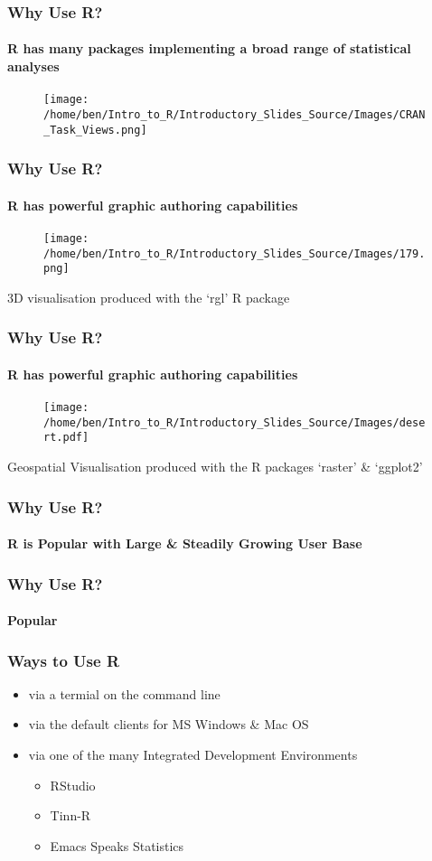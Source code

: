 \documentclass[xcolor=dvipsnames]{beamer}
\begin{document}
\begin{frame} 
\frametitle{Why Use R?}
\framesubtitle{R has many packages implementing a broad range of statistical analyses}

\begin{figure}
\texttt{[image: /home/ben/Intro\_to\_R/Introductory\_Slides\_Source/Images/CRAN\_Task\_Views.png]}
\end{figure}

\end{frame}

\begin{frame} 
\frametitle{Why Use R?}
\framesubtitle{R has powerful graphic authoring capabilities}

\begin{figure}
\texttt{[image: /home/ben/Intro\_to\_R/Introductory\_Slides\_Source/Images/179.png]}
\end{figure}

\tiny 3D visualisation produced with the `rgl' R package

\end{frame}

\begin{frame} 
\frametitle{Why Use R?}
\framesubtitle{R has powerful graphic authoring capabilities}

\begin{figure}
\texttt{[image: /home/ben/Intro\_to\_R/Introductory\_Slides\_Source/Images/desert.pdf]}
\end{figure}

\tiny Geospatial Visualisation produced with the R packages `raster' \& `ggplot2'

\end{frame}




\begin{frame} 
\frametitle{Why Use R?}
\framesubtitle{R is Popular with Large \& Steadily Growing User Base}


\end{frame}


\begin{frame} 
\frametitle{Why Use R?}
\framesubtitle{Popular}
\end{frame}



\begin{frame} 
\frametitle{Ways to Use R}
\begin{itemize}
\item via a termial on the command line
\item via the default clients for MS Windows \& Mac OS
\item via one of the many Integrated Development Environments \begin{itemize}
 \item RStudio
 \item Tinn-R
 \item Emacs Speaks Statistics \end{itemize}
\end{itemize}
\end{frame}
\end{document}
